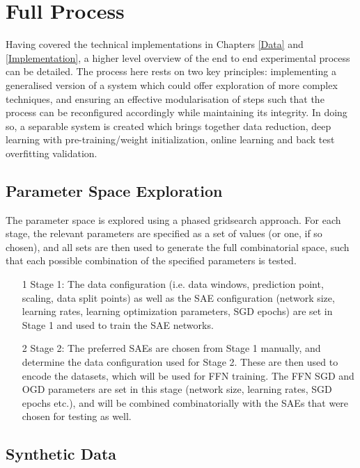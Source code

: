 \documentclass[a4paper,11pt,oneside]{article}
\theoremstyle{plain}
\theoremstyle{definition}
\begin{document}
\newpage
\section{Full Process}\label{imp_proc}

Having covered the technical implementations in Chapters \ref{Data} and \ref{Implementation}, a higher level overview of the end to end experimental process can be detailed. The process here rests on two key principles: implementing a generalised version of a system which could offer exploration of more complex techniques, and ensuring an effective modularisation of steps such that the process can be reconfigured accordingly while maintaining its integrity. In doing so, a separable system is created which brings together data reduction, deep learning with pre-training/weight initialization, online learning and back test overfitting validation.

\subsection{Parameter Space Exploration}\label{proc_parameters}

The parameter space is explored using a phased gridsearch approach. For each stage, the relevant parameters are specified as a set of values (or one, if so chosen), and all sets are then used to generate the full combinatorial space, such that each possible combination of the specified parameters is tested.

\begin{itemize}
	\item[1] Stage 1: The data configuration (i.e. data windows, prediction point, scaling, data split points) as well as the SAE configuration (network size, learning rates, learning optimization parameters, SGD epochs) are set in Stage 1 and used to train the SAE networks.
	\item[2] Stage 2: The preferred SAEs are chosen from Stage 1 manually, and determine the data configuration used for Stage 2. These are then used to encode the datasets, which will be used for FFN training. The FFN SGD and OGD parameters are set in this stage (network size, learning rates, SGD epochs etc.), and will be combined combinatorially with the SAEs that were chosen for testing as well.
\end{itemize}

\subsection{Synthetic Data}\label{proc_synthetic}
\end{document}
